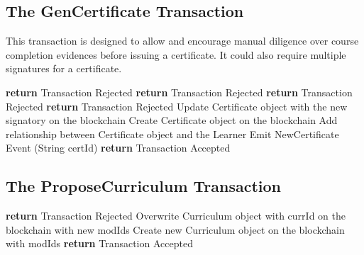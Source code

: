 \subsection{The GenCertificate Transaction}

This transaction is designed to allow and encourage manual diligence over course completion evidences before issuing a certificate.
It could also require multiple signatures for a certificate.
\clearpage
\begin{algorithm}
	\begin{algorithmic}[0]
		 \textbf{return} Transaction Rejected \EndIf
		 \textbf{return} Transaction Rejected \EndIf
		\Else
		 \textbf{return} Transaction Rejected \EndIf
		 \textbf{return} Transaction Rejected \EndIf
		\EndIf
		\State Update Certificate object with the new signatory on the blockchain
		\Else
		\State Create Certificate object on the blockchain
		\EndIf
		\State Add relationship between Certificate object and the Learner
		\State Emit NewCertificate Event (String certId)
		\EndIf
		\State \textbf{return} Transaction Accepted
		\EndFunction
	\end{algorithmic}
\end{algorithm}

\subsection{The ProposeCurriculum Transaction}

\begin{algorithm}
	\begin{algorithmic}[0]
		\State \textbf{return} Transaction Rejected
		\EndIf
		\State Overwrite Curriculum object with currId on the blockchain with new modIds
		\Else
		\State Create new Curriculum object on the blockchain with modIds
		\EndIf
		\State \textbf{return} Transaction Accepted
		\EndFunction
	\end{algorithmic}
\end{algorithm}

